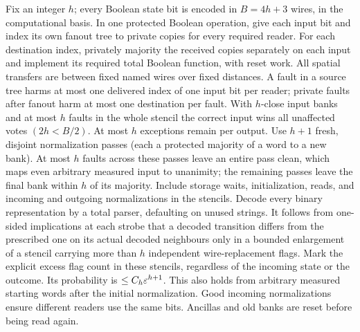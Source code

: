 Fix an integer \(h\); every Boolean state bit is encoded in \(B=4h+3\) wires, in the computational basis. In one protected Boolean operation, give each input bit and index its own fanout tree to private copies for every required reader. For each destination index, privately majority the received copies separately on each input and implement its required total Boolean function, with reset work. All spatial transfers are between fixed named wires over fixed distances. A fault in a source tree harms at most one delivered index of one input bit per reader; private faults after fanout harm at most one destination per fault. With \(h\)-close input banks and at most \(h\) faults in the whole stencil the correct input wins all unaffected votes \((2h<B/2)\). At most \(h\) exceptions remain per output. Use \(h+1\) fresh, disjoint normalization passes (each a protected majority of a word to a new bank). At most \(h\) faults across these passes leave an entire pass clean, which maps even arbitrary measured input to unanimity; the remaining passes leave the final bank within \(h\) of its majority. Include storage waits, initialization, reads, and incoming and outgoing normalizations in the stencils. Decode every binary representation by a total parser, defaulting on unused strings. It follows from one-sided implications at each strobe that a decoded transition differs from the prescribed one on its actual decoded neighbours only in a bounded enlargement of a stencil carrying more than \(h\) independent wire-replacement flags. Mark the explicit excess flag count in these stencils, regardless of the incoming state or the outcome. Its probability is \(\le C_{h} \varepsilon^{h+1}\). This also holds from arbitrary measured starting words after the initial normalization. Good incoming normalizations ensure different readers use the same bits. Ancillas and old banks are reset before being read again.

